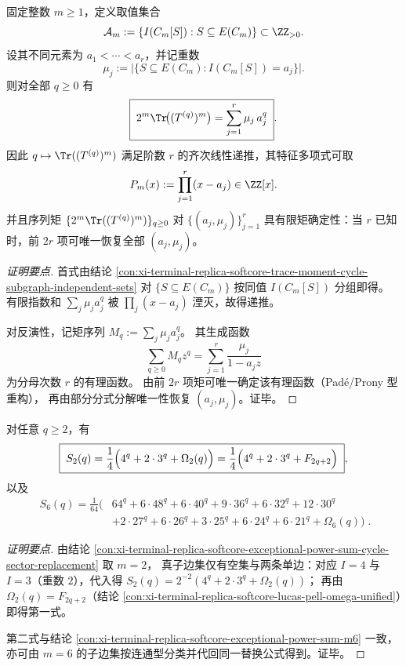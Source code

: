 \begin{conclusion}[固定 \(m\) 下的独立集谱反演与最小递推]\label{con:xi-terminal-replica-softcore-cycle-subgraph-spectrum-inversion-minimal-recurrence}
固定整数 \(m\ge 1\)，定义取值集合
\[
\mathcal A_m:=\{I(C_m[S]):S\subseteq E(C_m)\}\subset\ZZ_{>0}.
\]
设其不同元素为 \(a_1<\cdots<a_r\)，并记重数
\[
\mu_j:=\bigl|\{S\subseteq E(C_m):I(C_m[S])=a_j\}\bigr|.
\]
则对全部 \(q\ge 0\) 有
\[
\boxed{\;
2^m\Tr\!\bigl((T^{(q)})^m\bigr)=\sum_{j=1}^{r}\mu_j\,a_j^{q}\; } .
\]
因此 \(q\mapsto \Tr((T^{(q)})^m)\) 满足阶数 \(r\) 的齐次线性递推，其特征多项式可取
\[
P_m(x):=\prod_{j=1}^{r}(x-a_j)\in\ZZ[x].
\]
并且序列矩 \(\{2^m\Tr((T^{(q)})^m)\}_{q\ge 0}\) 对 \(\{(a_j,\mu_j)\}_{j=1}^{r}\) 具有限矩确定性：当 \(r\) 已知时，前 \(2r\) 项可唯一恢复全部 \((a_j,\mu_j)\)。
\end{conclusion}
\begin{proof}[证明要点]
首式由结论 \ref{con:xi-terminal-replica-softcore-trace-moment-cycle-subgraph-independent-sets}
对 \(\{S\subseteq E(C_m)\}\) 按同值 \(I(C_m[S])\) 分组即得。
有限指数和 \(\sum_j\mu_j a_j^q\) 被 \(\prod_j(x-a_j)\) 湮灭，故得递推。
\par
对反演性，记矩序列 \(M_q:=\sum_j\mu_j a_j^q\)。
其生成函数
\[
\sum_{q\ge 0}M_q z^q=\sum_{j=1}^{r}\frac{\mu_j}{1-a_j z}
\]
为分母次数 \(r\) 的有理函数。
由前 \(2r\) 项矩可唯一确定该有理函数（Pad\'e/Prony 型重构），
再由部分分式分解唯一性恢复 \((a_j,\mu_j)\)。证毕。
\end{proof}

\begin{conclusion}[低阶例外幂和闭式的统一回收：\(m=2\) 与 \(m=6\)]\label{con:xi-terminal-replica-softcore-exceptional-power-sum-m2-m6-recovered}
对任意 \(q\ge 2\)，有
\[
\boxed{\;
S_2(q)=\frac14\Bigl(4^{q}+2\cdot 3^{q}+\Omega_2(q)\Bigr)
=\frac14\Bigl(4^{q}+2\cdot 3^{q}+F_{2q+2}\Bigr)\; } ,
\]
以及
\[
\boxed{\;
\begin{aligned}
S_6(q)=\frac1{64}\Big(
&64^{q}+6\cdot48^{q}+6\cdot40^{q}+9\cdot36^{q}+6\cdot32^{q}+12\cdot30^{q}\\
&+2\cdot27^{q}+6\cdot26^{q}+3\cdot25^{q}+6\cdot24^{q}+6\cdot21^{q}+\Omega_6(q)
\Big)\; .
\end{aligned}
}
\]
\end{conclusion}
\begin{proof}[证明要点]
由结论 \ref{con:xi-terminal-replica-softcore-exceptional-power-sum-cycle-sector-replacement} 取 \(m=2\)，
真子边集仅有空集与两条单边：对应 \(I=4\) 与 \(I=3\)（重数 \(2\)），代入得
\(
S_2(q)=2^{-2}(4^q+2\cdot 3^q+\Omega_2(q))
\)；
再由 \(\Omega_2(q)=F_{2q+2}\)（结论 \ref{con:xi-terminal-replica-softcore-lucas-pell-omega-unified}）即得第一式。
\par
第二式与结论 \ref{con:xi-terminal-replica-softcore-exceptional-power-sum-m6} 一致，
亦可由 \(m=6\) 的子边集按连通型分类并代回同一替换公式得到。证毕。
\end{proof}


